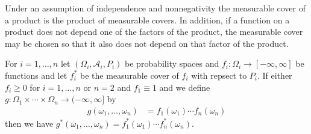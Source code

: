 Under an assumption of independence and nonnegativity the measurable cover of a product is the product of measurable covers.  In addition, if a function on a product does not depend one of the factors of the product, the measurable cover may be chosen so that it also does not depend on that factor of the product.
\begin{prop}\label{MeasurableCoverProductOfIndependent}For $i=1, \dotsc, n$ let $(\Omega_i, \mathcal{A}_i, P_i)$  be probability spaces and $f_i : \Omega_i \to [-\infty, \infty]$ be functions and let $f_i^*$ be the measurable cover of $f_i$ with repsect to $P_i$.  If either $f_i \geq 0$ for $i=1, \dotsc, n$ or $n=2$ and $f_1 \equiv 1$ and we define $g : \Omega_1 \times \dotsb \times \Omega_n \to (-\infty, \infty]$ by
\begin{align*}
g(\omega_1, \dotsc, \omega_n) &= f_1(\omega_1) \dotsb f_n(\omega_n)
\end{align*}
then we have $g^*(\omega_1, \dotsc, \omega_n) = f^*_1(\omega_1) \dotsb f^*_n(\omega_n)$.
\end{prop}
